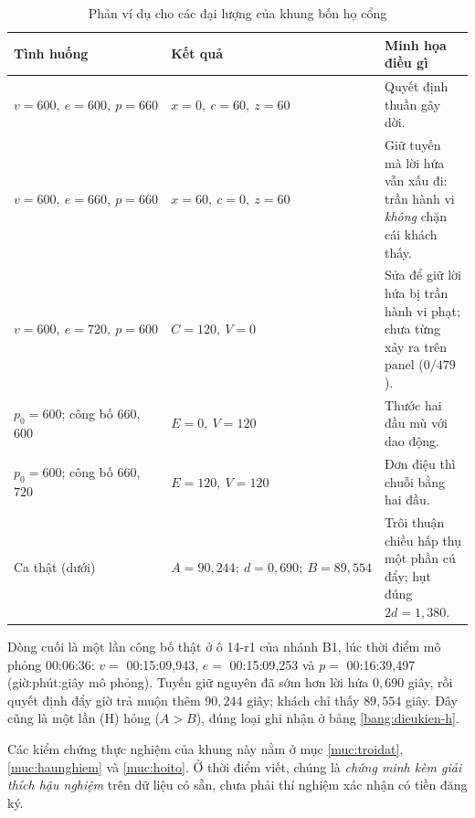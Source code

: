 \begin{table}[htbp]
\centering
\caption{Phản ví dụ cho các đại lượng của khung bốn họ cổng}
\label{bang:phanvidu}
\small
\begin{tabular}{@{}llp{6.4cm}@{}}
\toprule
\textbf{Tình huống} & \textbf{Kết quả} & \textbf{Minh họa điều gì}\\
\midrule
$v = 600,\ e = 600,\ p = 660$ & $x = 0,\ c = 60,\ z = 60$ & Quyết định thuần gây dời.\\
$v = 600,\ e = 660,\ p = 660$ & $x = 60,\ c = 0,\ z = 60$ & Giữ tuyến mà lời hứa vẫn xấu đi: trần
hành vi \emph{không} chặn cái khách thấy.\\
$v = 600,\ e = 720,\ p = 600$ & $C = 120,\ V = 0$ & Sửa để giữ lời hứa bị trần hành vi phạt; chưa
từng xảy ra trên panel ($0/479$).\\
$p_0 = 600$; công bố $660$, $600$ & $E = 0,\ V = 120$ & Thước hai đầu mù với dao động.\\
$p_0 = 600$; công bố $660$, $720$ & $E = 120,\ V = 120$ & Đơn điệu thì chuỗi bằng hai đầu.\\
Ca thật (dưới) & $A = 90{,}244;\ d = 0{,}690;\ B = 89{,}554$ & Trôi thuận chiều hấp thụ một phần
cú đẩy; hụt đúng $2d = 1{,}380$.\\
\bottomrule
\end{tabular}
\end{table}

Dòng cuối là một lần công bố thật ở ô 14-r1 của nhánh B1, lúc thời điểm mô phỏng 00:06:36:
$v = $ 00:15:09,943, $e = $ 00:15:09,253 và $p = $ 00:16:39,497 (giờ:phút:giây mô phỏng). Tuyến giữ
nguyên đã sớm hơn lời hứa $0{,}690$ giây, rồi quyết định đẩy giờ trả muộn thêm $90{,}244$ giây;
khách chỉ thấy $89{,}554$ giây. Đây cũng là một lần (H) hỏng ($A > B$), đúng loại ghi nhận ở bảng
\ref{bang:dieukien-h}.

Các kiểm chứng thực nghiệm của khung này nằm ở mục \ref{muc:troidat}, \ref{muc:haunghiem} và
\ref{muc:hoito}. Ở thời điểm viết, chúng là \emph{chứng minh kèm giải thích hậu nghiệm} trên dữ
liệu có sẵn, chưa phải thí nghiệm xác nhận có tiền đăng ký.
